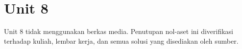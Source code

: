 \section*{Unit 8}
Unit 8 tidak menggunakan berkas media. Penutupan nol-aset ini diverifikasi terhadap kuliah, lembar kerja, dan semua solusi yang disediakan oleh sumber.
